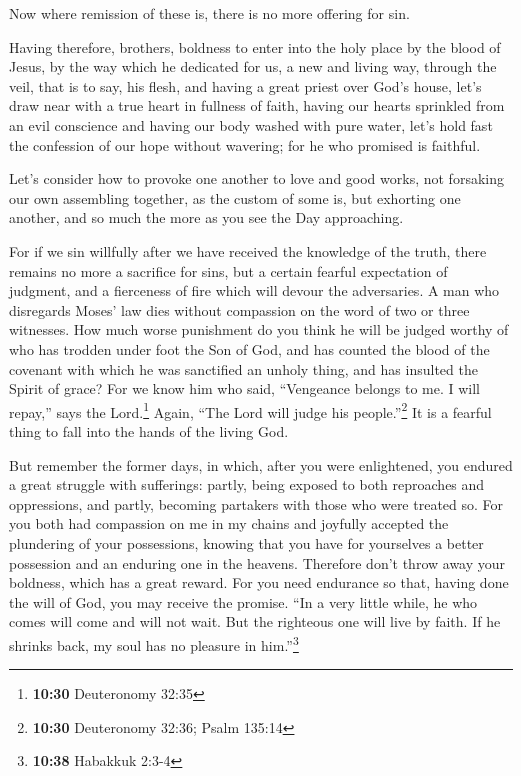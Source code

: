  Now where remission of these is, there is no more
offering for sin.

 Having therefore, brothers, boldness to enter into the
holy place by the blood of Jesus,  by the way which he
dedicated for us, a new and living way, through the veil, that is to
say, his flesh,  and having a great priest over God's
house,  let's draw near with a true heart in fullness of
faith, having our hearts sprinkled from an evil conscience and having
our body washed with pure water,  let's hold fast the
confession of our hope without wavering; for he who promised is
faithful.

 Let's consider how to provoke one another to love and
good works,  not forsaking our own assembling together,
as the custom of some is, but exhorting one another, and so much the
more as you see the Day approaching.

 For if we sin willfully after we have received the
knowledge of the truth, there remains no more a sacrifice for sins,
 but a certain fearful expectation of judgment, and a
fierceness of fire which will devour the adversaries.  A
man who disregards Moses' law dies without compassion on the word of two
or three witnesses.  How much worse punishment do you
think he will be judged worthy of who has trodden under foot the Son of
God, and has counted the blood of the covenant with which he was
sanctified an unholy thing, and has insulted the Spirit of grace?
 For we know him who said, ``Vengeance belongs to me. I
will repay,'' says the Lord.\footnote{\textbf{10:30} Deuteronomy 32:35}
Again, ``The Lord will judge his people.''\footnote{\textbf{10:30}
  Deuteronomy 32:36; Psalm 135:14}  It is a fearful thing
to fall into the hands of the living God.

 But remember the former days, in which, after you were
enlightened, you endured a great struggle with sufferings:
 partly, being exposed to both reproaches and
oppressions, and partly, becoming partakers with those who were treated
so.  For you both had compassion on me in my chains and
joyfully accepted the plundering of your possessions, knowing that you
have for yourselves a better possession and an enduring one in the
heavens.  Therefore don't throw away your boldness, which
has a great reward.  For you need endurance so that,
having done the will of God, you may receive the promise.
 ``In a very little while, he who comes will come and
will not wait.  But the righteous one will live by faith.
If he shrinks back, my soul has no pleasure in him.''\footnote{\textbf{10:38}
  Habakkuk 2:3-4}

